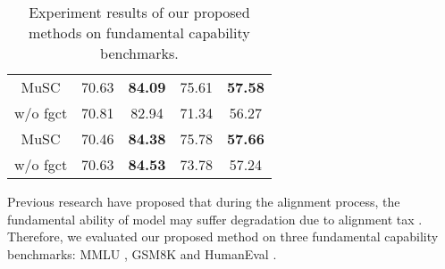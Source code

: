\begin{table}[t]
{\begin{tabular}{ccccc}
\multicolumn{1}{c|}{MuSC}                            & 70.63                           & \textbf{84.09}                   & \multicolumn{1}{c|}{75.61}                                & \textbf{57.58}                 \\
\multicolumn{1}{c|}{w/o fgct}                      & 70.81                           & 82.94                            & \multicolumn{1}{c|}{{\color[HTML]{9B9B9B} 71.34}}         & {\color[HTML]{9B9B9B} 56.27}   \\\midrule
\multicolumn{1}{c|}{MuSC}                            & 70.46                           & \textbf{84.38}                   & \multicolumn{1}{c|}{75.78}                                & \textbf{57.66}                 \\ 
\multicolumn{1}{c|}{w/o fgct}                      & 70.63                           & \textbf{84.53}                   & \multicolumn{1}{c|}{{\color[HTML]{9B9B9B} 73.78}}         & {\color[HTML]{9B9B9B} 57.24}   \\\bottomrule
\end{tabular}}
\caption{Experiment results of our proposed methods on fundamental capability benchmarks.}
\label{tab:fundamental}
\end{table}


Previous research have proposed that during the alignment process, the fundamental ability of model may suffer degradation due to alignment tax \cite{ouyang2022training}. Therefore, we evaluated our proposed method on three fundamental capability benchmarks: MMLU \cite{hendrycks2021measuring}, GSM8K \cite{cobbe2021trainingverifierssolvemath} and HumanEval \cite{chen2021evaluatinglargelanguagemodels}.

